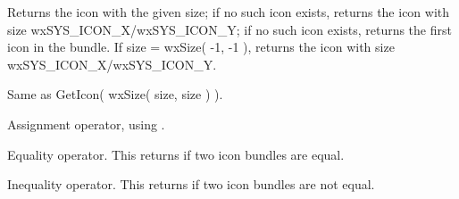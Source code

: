 \label{wxiconbundlegeticon}


Returns the icon with the given size; if no such icon exists,
returns the icon with size wxSYS\_ICON\_X/wxSYS\_ICON\_Y;
if no such icon exists,
returns the first icon in the bundle. If size = wxSize( -1, -1 ),
returns the icon with size wxSYS\_ICON\_X/wxSYS\_ICON\_Y.


Same as GetIcon( wxSize( size, size ) ).

\label{wxiconbundleoperatorassign}


Assignment operator, using .

\label{wxiconbundleoperatorequals}


Equality operator. This returns \true if two icon bundles are equal.

\label{wxiconbundleoperatornotequals}


Inequality operator. This returns \true if two icon bundles are not equal.
